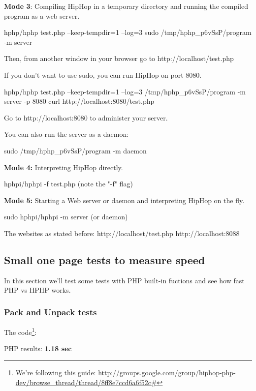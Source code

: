 \textbf{Mode 3}: Compiling HipHop in a temporary directory and running the compiled program as a web server.
\begin{codelisting}
hphp/hphp test.php --keep-tempdir=1 --log=3
sudo /tmp/hphp_p6vSsP/program -m server
\end{codelisting}

Then, from another window in your browser go to http://localhost/test.php

If you don't want to use sudo, you can run HipHop on port 8080.
\begin{codelisting}
hphp/hphp test.php --keep-tempdir=1 --log=3
/tmp/hphp_p6vSsP/program -m server -p 8080
curl http://localhost:8080/test.php
\end{codelisting}

Go to http://localhost:8080 to administer your server.

You can also run the server as a daemon:
\begin{codelisting}sudo /tmp/hphp_p6vSsP/program -m daemon\end{codelisting}
\textbf{Mode 4:} Interpreting HipHop directly.
\begin{codelisting}
hphpi/hphpi -f test.php (note the "-f" flag)
\end{codelisting}
\textbf{Mode 5:} Starting a Web server or daemon and interpreting HipHop on the fly.
\begin{codelisting}
sudo hphpi/hphpi -m server (or daemon)
\end{codelisting}
The websites as stated before:
http://localhost/test.php
http://localhost:8088


\subsection{Small one page tests to measure speed}
In this section we'll test some tests with PHP built-in fuctions and see how fast PHP vs HPHP works.
\subsubsection{Pack and Unpack tests}
The code\footnote{We're following this guide: \url{http://groups.google.com/group/hiphop-php-dev/browse_thread/thread/8ff8e7ccd6a6f52c\#}}:
PHP results: \textbf{1.18 sec}

